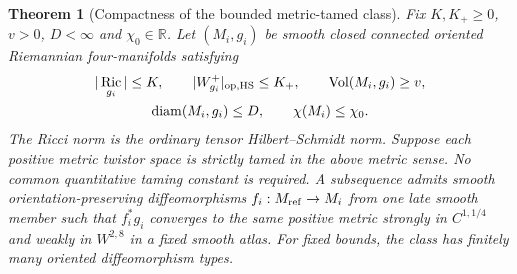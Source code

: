 \documentclass[11pt]{article}
\numberwithin{equation}{section}
\newtheorem{theorem}{Theorem}[section]
\theoremstyle{definition}
\theoremstyle{remark}
\DeclareMathOperator{\Ric}{Ric}
\DeclareMathOperator{\Vol}{Vol}
\begin{document}
\begin{theorem}[Compactness of the bounded metric-tamed class]
\label{thm:tamed-metric-compactness}
Fix $K,K_+\ge0$, $v>0$, $D<\infty$ and $\chi_0\in\mathbb R$.
Let $(M_i,g_i)$ be smooth closed connected oriented Riemannian
four-manifolds satisfying
\begin{equation}\label{eq:tamed-metric-bounds}
 \begin{gathered}
 |\Ric_{g_i}|\le K,\qquad |W^+_{g_i}|_{\rm op,HS}\le K_+,
 \qquad \Vol(M_i,g_i)\ge v,\\
 \operatorname{diam}(M_i,g_i)\le D,\qquad
 \chi(M_i)\le\chi_0.
 \end{gathered}
\end{equation}
The Ricci norm is the ordinary tensor Hilbert--Schmidt norm.
Suppose each positive metric twistor space is strictly tamed
in the above metric sense. No common quantitative taming
constant is required. A subsequence admits smooth
orientation-preserving diffeomorphisms
$f_i:M_{\rm ref}\to M_i$ from one late smooth member such
that $f_i^*g_i$ converges to the same positive metric strongly
in $C^{1,1/4}$ and weakly in $W^{2,8}$ in a fixed smooth atlas.
For fixed bounds, the class has finitely many oriented
diffeomorphism types.
\end{theorem}
\end{document}
